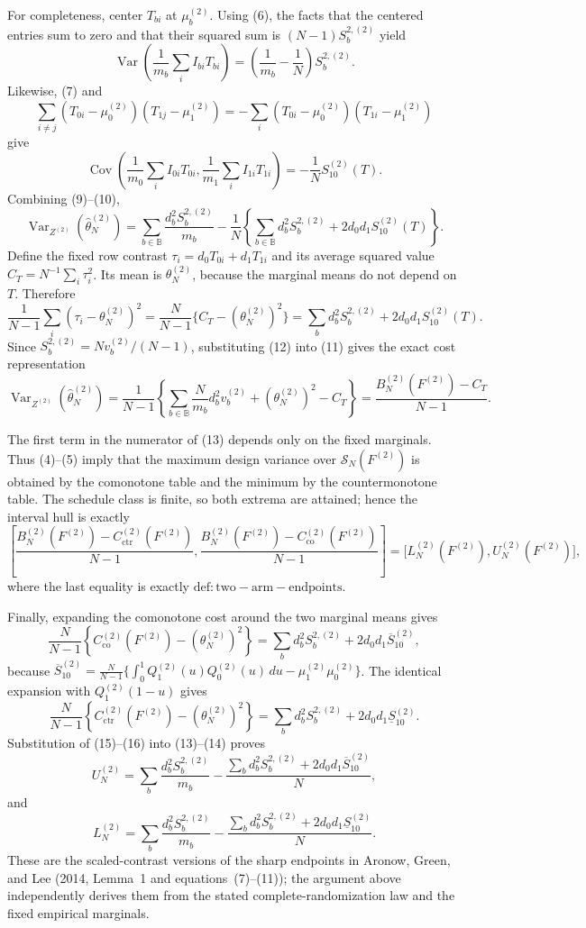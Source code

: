 For completeness, center \(T_{bi}\) at \(\mu_b^{(2)}\).  Using (6), the facts that the centered entries sum to zero and that their squared sum is \((N-1)S_b^{2,(2)}\) yield
\[
\operatorname{Var}\!\left(\frac1{m_b}\sum_i I_{bi}T_{bi}\right)
=\left(\frac1{m_b}-\frac1N\right)S_b^{2,(2)}. \tag{9}
\]
Likewise, (7) and
\[
\sum_{i\ne j}(T_{0i}-\mu_0^{(2)})(T_{1j}-\mu_1^{(2)})
=-\sum_i(T_{0i}-\mu_0^{(2)})(T_{1i}-\mu_1^{(2)})
\]
give
\[
\operatorname{Cov}\!\left(\frac1{m_0}\sum_iI_{0i}T_{0i},
\frac1{m_1}\sum_iI_{1i}T_{1i}\right)
=-\frac1N S_{10}^{(2)}(T). \tag{10}
\]
Combining (9)--(10),
\[
\operatorname{Var}_{Z^{(2)}}(\widehat\theta_N^{(2)})
=\sum_{b\in\mathbb B}\frac{d_b^2S_b^{2,(2)}}{m_b}
-\frac1N\left\{\sum_{b\in\mathbb B}d_b^2S_b^{2,(2)}
+2d_0d_1S_{10}^{(2)}(T)\right\}. \tag{11}
\]
Define the fixed row contrast \(\tau_i=d_0T_{0i}+d_1T_{1i}\) and its average squared value
\(C_T=N^{-1}\sum_i\tau_i^2\).  Its mean is \(\theta_N^{(2)}\), because the marginal means do not depend on \(T\).  Therefore
\[
\frac1{N-1}\sum_i(\tau_i-\theta_N^{(2)})^2
=\frac{N}{N-1}\{C_T-(\theta_N^{(2)})^2\}
=\sum_b d_b^2S_b^{2,(2)}+2d_0d_1S_{10}^{(2)}(T). \tag{12}
\]
Since \(S_b^{2,(2)}=Nv_b^{(2)}/(N-1)\), substituting (12) into (11) gives the exact cost representation
\[
\operatorname{Var}_{Z^{(2)}}(\widehat\theta_N^{(2)})
=\frac{1}{N-1}\left\{
\sum_{b\in\mathbb B}\frac{N}{m_b}d_b^2v_b^{(2)}
+(\theta_N^{(2)})^2-C_T\right\}
=\frac{B_N^{(2)}(F^{(2)})-C_T}{N-1}. \tag{13}
\]

The first term in the numerator of (13) depends only on the fixed marginals.  Thus (4)--(5) imply that the maximum design variance over \(\mathcal S_N(F^{(2)})\) is obtained by the comonotone table and the minimum by the countermonotone table.  The schedule class is finite, so both extrema are attained; hence the interval hull is exactly
\[
\left[
\frac{B_N^{(2)}(F^{(2)})-C_{\mathrm{ctr}}^{(2)}(F^{(2)})}{N-1},
\frac{B_N^{(2)}(F^{(2)})-C_{\mathrm{co}}^{(2)}(F^{(2)})}{N-1}
\right]
=\bigl[L_N^{(2)}(F^{(2)}),U_N^{(2)}(F^{(2)})\bigr], \tag{14}
\]
where the last equality is exactly \(\mathrm{def:two-arm-endpoints}\).

Finally, expanding the comonotone cost around the two marginal means gives
\[
\frac{N}{N-1}\left\{C_{\mathrm{co}}^{(2)}(F^{(2)})-(\theta_N^{(2)})^2\right\}
=\sum_b d_b^2S_b^{2,(2)}+2d_0d_1\overline S_{10}^{(2)}, \tag{15}
\]
because
\(\overline S_{10}^{(2)}=\frac{N}{N-1}\{\int_0^1Q_1^{(2)}(u)Q_0^{(2)}(u)\,du-\mu_1^{(2)}\mu_0^{(2)}\}\).
The identical expansion with \(Q_1^{(2)}(1-u)\) gives
\[
\frac{N}{N-1}\left\{C_{\mathrm{ctr}}^{(2)}(F^{(2)})-(\theta_N^{(2)})^2\right\}
=\sum_b d_b^2S_b^{2,(2)}+2d_0d_1\underline S_{10}^{(2)}. \tag{16}
\]
Substitution of (15)--(16) into (13)--(14) proves
\[
U_N^{(2)}
=\sum_b\frac{d_b^2S_b^{2,(2)}}{m_b}
-\frac{\sum_b d_b^2S_b^{2,(2)}+2d_0d_1\overline S_{10}^{(2)}}{N},
\]
and
\[
L_N^{(2)}
=\sum_b\frac{d_b^2S_b^{2,(2)}}{m_b}
-\frac{\sum_b d_b^2S_b^{2,(2)}+2d_0d_1\underline S_{10}^{(2)}}{N}.
\]
These are the scaled-contrast versions of the sharp endpoints in Aronow, Green, and Lee (2014, Lemma~1 and equations~(7)--(11)); the argument above independently derives them from the stated complete-randomization law and the fixed empirical marginals.
